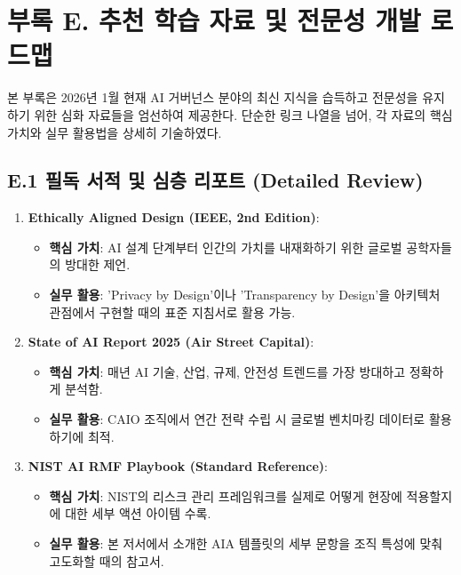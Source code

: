 \chapter*{부록 E. 추천 학습 자료 및 전문성 개발 로드맵}
\label{ch:appendix_e}

본 부록은 2026년 1월 현재 AI 거버넌스 분야의 최신 지식을 습득하고 전문성을 유지하기 위한 심화 자료들을 엄선하여 제공한다. 단순한 링크 나열을 넘어, 각 자료의 핵심 가치와 실무 활용법을 상세히 기술하였다.

\section*{E.1 필독 서적 및 심층 리포트 (Detailed Review)}

\begin{enumerate}
    \item \textbf{Ethically Aligned Design (IEEE, 2nd Edition)}: 
    \begin{itemize}
        \item \textbf{핵심 가치}: AI 설계 단계부터 인간의 가치를 내재화하기 위한 글로벌 공학자들의 방대한 제언.
        \item \textbf{실무 활용}: 'Privacy by Design'이나 'Transparency by Design'을 아키텍처 관점에서 구현할 때의 표준 지침서로 활용 가능.
    \end{itemize}
    \item \textbf{State of AI Report 2025 (Air Street Capital)}:
    \begin{itemize}
        \item \textbf{핵심 가치}: 매년 AI 기술, 산업, 규제, 안전성 트렌드를 가장 방대하고 정확하게 분석함.
        \item \textbf{실무 활용}: CAIO 조직에서 연간 전략 수립 시 글로벌 벤치마킹 데이터로 활용하기에 최적.
    \end{itemize}
    \item \textbf{NIST AI RMF Playbook (Standard Reference)}:
    \begin{itemize}
        \item \textbf{핵심 가치}: NIST의 리스크 관리 프레임워크를 실제로 어떻게 현장에 적용할지에 대한 세부 액션 아이템 수록.
        \item \textbf{실무 활용}: 본 저서에서 소개한 AIA 템플릿의 세부 문항을 조직 특성에 맞춰 고도화할 때의 참고서.
    \end{itemize}
\end{enumerate}

